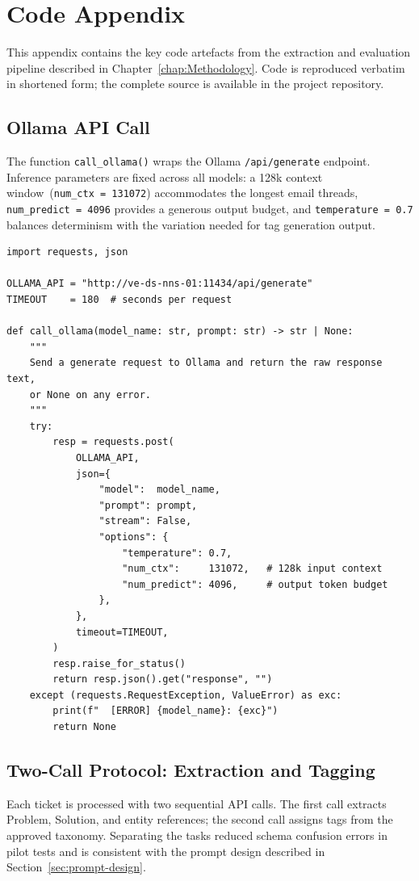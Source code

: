 \chapter{Code Appendix}
%
\label{chap:CodeAppendix}
%
This appendix contains the key code artefacts from the extraction and evaluation
pipeline described in Chapter~\ref{chap:Methodology}.  Code is reproduced
verbatim in shortened form; the complete source is available in the project
repository.

\section{Ollama API Call}
\label{sec:app-ollama-call}
%
The function \texttt{call\_ollama()} wraps the Ollama \texttt{/api/generate}
endpoint.  Inference parameters are fixed across all models: a 128k context
window~(\texttt{num\_ctx~=~131072}) accommodates the longest email threads,
\texttt{num\_predict~=~4096} provides a generous output budget, and
\texttt{temperature~=~0.7} balances determinism with the variation needed for tag generation
output.

\begin{verbatim}
import requests, json

OLLAMA_API = "http://ve-ds-nns-01:11434/api/generate"
TIMEOUT    = 180  # seconds per request

def call_ollama(model_name: str, prompt: str) -> str | None:
    """
    Send a generate request to Ollama and return the raw response text,
    or None on any error.
    """
    try:
        resp = requests.post(
            OLLAMA_API,
            json={
                "model":  model_name,
                "prompt": prompt,
                "stream": False,
                "options": {
                    "temperature": 0.7,
                    "num_ctx":     131072,   # 128k input context
                    "num_predict": 4096,     # output token budget
                },
            },
            timeout=TIMEOUT,
        )
        resp.raise_for_status()
        return resp.json().get("response", "")
    except (requests.RequestException, ValueError) as exc:
        print(f"  [ERROR] {model_name}: {exc}")
        return None
\end{verbatim}

\section{Two-Call Protocol: Extraction and Tagging}
\label{sec:app-two-call}
%
Each ticket is processed with two sequential API calls.  The first call
extracts Problem, Solution, and entity references; the second call assigns
tags from the approved taxonomy.  Separating the tasks reduced schema
confusion errors in pilot tests and is consistent with the prompt design
described in Section~\ref{sec:prompt-design}.

